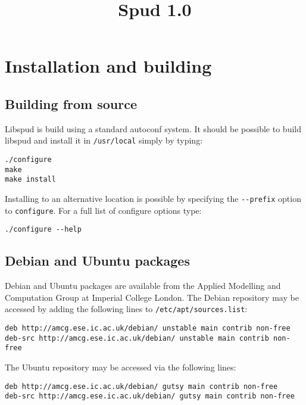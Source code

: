 \documentclass[a4paper, 11pt]{book}
\title{Spud 1.0}
\begin{document}
\maketitle

\tableofcontents
\chapter{Installation and building}

\section{Building from source}

Libspud is build using a standard autoconf system. It should be possible to
build libspud and install it in \verb+/usr/local+ simply by typing:

\begin{verbatim}
./configure
make
make install
\end{verbatim}

Installing to an alternative location is possible by specifying the
\verb+--prefix+ option to \verb+configure+. For a full list of configure
options type:

\begin{verbatim}
./configure --help
\end{verbatim}

\section{Debian and Ubuntu packages}

Debian and Ubuntu packages are available from the Applied Modelling and
Computation Group at Imperial College London. The Debian repository may be
accessed by adding the following lines to \verb+/etc/apt/sources.list+:

\begin{verbatim}
deb http://amcg.ese.ic.ac.uk/debian/ unstable main contrib non-free
deb-src http://amcg.ese.ic.ac.uk/debian/ unstable main contrib non-free
\end{verbatim}

The Ubuntu repository may be accessed via the following lines:

\begin{verbatim}
deb http://amcg.ese.ic.ac.uk/debian/ gutsy main contrib non-free
deb-src http://amcg.ese.ic.ac.uk/debian/ gutsy main contrib non-free
\end{verbatim}
\end{document}
